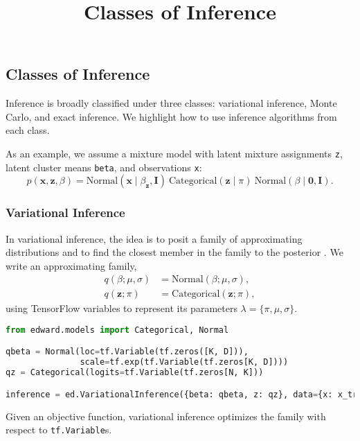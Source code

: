 \title{Classes of Inference}

\subsection{Classes of Inference}

Inference is broadly classified under three classes: variational
inference, Monte Carlo, and exact inference.
We highlight how to use inference algorithms from each class.

As an example, we assume a mixture model with latent mixture
assignments \texttt{z}, latent cluster means \texttt{beta}, and
observations \texttt{x}:
\begin{equation*}
p(\mathbf{x}, \mathbf{z}, \beta)
=
\text{Normal}(\mathbf{x} \mid \beta_{\mathbf{z}}, \mathbf{I})
~
\text{Categorical}(\mathbf{z}\mid \pi)
~
\text{Normal}(\beta\mid \mathbf{0}, \mathbf{I}).
\end{equation*}

\subsubsection{Variational Inference}

In variational inference, the idea is to posit a family of approximating
distributions and to find the closest member in the family to the
posterior \citep{jordan1999introduction}.
We write an approximating family,
\begin{align*}
q(\beta;\mu,\sigma) &= \text{Normal}(\beta; \mu,\sigma), \\[1.5ex]
q(\mathbf{z};\pi) &= \text{Categorical}(\mathbf{z};\pi),
\end{align*}
using TensorFlow variables to represent its parameters
$\lambda=\{\pi,\mu,\sigma\}$.
\begin{lstlisting}[language=Python]
from edward.models import Categorical, Normal

qbeta = Normal(loc=tf.Variable(tf.zeros([K, D])),
               scale=tf.exp(tf.Variable(tf.zeros[K, D])))
qz = Categorical(logits=tf.Variable(tf.zeros[N, K]))

inference = ed.VariationalInference({beta: qbeta, z: qz}, data={x: x_train})
\end{lstlisting}
Given an objective function, variational inference optimizes the
family with respect to \texttt{tf.Variable}s.

